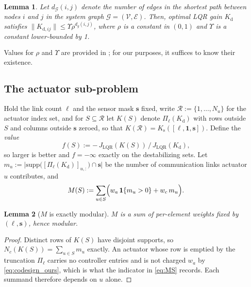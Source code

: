 \documentclass[letterpaper, 10pt, conference]{ieeeconf}
\newtheorem{lemma}{Lemma}
\begin{document}
\begin{lemma} \label{lemm:decay} Let $d_{\mathcal{G}}(i, j)$ denote the number of edges in the shortest path between nodes $i$ and $j$ in the system graph $\mathcal{G} = (\mathcal{V}, \mathcal{E})$. Then, optimal LQR gain $K_\mathrm{d}$ satisfies $\|K_{\mathrm{d},{ij}}\| \leq \Upsilon \rho^{d_g(i,j)}$, where $\rho$ is a constant in $(0, 1)$ and $\Upsilon$ is a constant lower-bounded by 1.
\end{lemma}

Values for $\rho$ and $\Upsilon$ are provided in \cite{shin}; for our purposes, it suffices to know their existence.

\subsection{The actuator sub-problem}

Hold the link count $\ell$ and the sensor mask $\mathbf{s}$ fixed, write
$\mathcal{R} := \{1,\dots,N_u\}$ for the actuator index set, and for
$S\subseteq\mathcal{R}$ let $K(S)$ denote $\Pi_\ell(K_\mathrm{d})$ with rows
outside $S$ and columns outside $\mathbf{s}$ zeroed, so that
$K(\mathcal{R}) = K_\mathrm{s}([\ell,\mathbf{1},\mathbf{s}])$. Define the
\emph{value}
\begin{equation}\label{eq:fS}
  f(S) := -\,J_{\mathrm{LQR}}(K(S))\,/\,J_{\mathrm{LQR}}(K_\mathrm{d}),
\end{equation}
so larger is better and $f = -\infty$ exactly on the destabilizing sets. Let
$m_u := \bigl|\mathrm{supp}\bigl([\Pi_\ell(K_\mathrm{d})]_{u,:}\bigr)\cap \mathbf{s}\bigr|$
be the number of communication links actuator $u$ contributes, and
\begin{equation}\label{eq:MS}
  M(S) := \sum_{u\in S}\Bigl( w_a\,\mathbf{1}\{m_u>0\} + w_c\,m_u \Bigr).
\end{equation}

\begin{lemma}[$M$ is exactly modular]\label{lemm:modular}
$M$ is a sum of per-element weights fixed by $(\ell,\mathbf{s})$, hence modular.
\end{lemma}
\begin{proof}
Distinct rows of $K(S)$ have disjoint supports, so $N_c(K(S)) = \sum_{u\in S}m_u$
exactly. An actuator whose row is emptied by the truncation $\Pi_\ell$ carries no
controller entries and is not charged $w_a$ by \eqref{eq:codesign_ours}, which is
what the indicator in \eqref{eq:MS} records. Each summand therefore depends on $u$
alone.
\end{proof}
\end{document}
